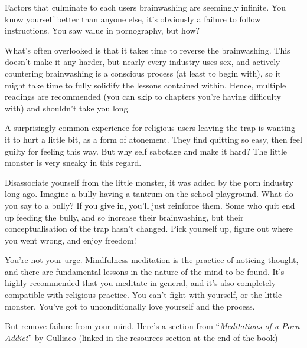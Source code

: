 \documentclass[
]{book}
\begin{document}
Factors that culminate to each users brainwashing are seemingly infinite. You know yourself better than anyone else, it's obviously a failure to follow instructions. You saw value in pornography, but how?

What's often overlooked is that it takes time to reverse the brainwashing. This doesn't make it any harder, but nearly every industry uses sex, and actively countering brainwashing is a conscious process (at least to begin with), so it might take time to fully solidify the lessons contained within. Hence, multiple readings are recommended (you can skip to chapters you're having difficulty with) and shouldn't take you long.

A surprisingly common experience for religious users leaving the trap is wanting it to hurt a little bit, as a form of atonement. They find quitting so easy, then feel guilty for feeling this way. But why self sabotage and make it hard? The little monster is very sneaky in this regard.

Disassociate yourself from the little monster, it was added by the porn industry long ago. Imagine a bully having a tantrum on the school playground. What do you say to a bully? If you give in, you'll just reinforce them. Some who quit end up feeding the bully, and so increase their brainwashing, but their conceptualisation of the trap hasn't changed. Pick yourself up, figure out where you went wrong, and enjoy freedom!

You're not your urge. Mindfulness meditation is the practice of noticing thought, and there are fundamental lessons in the nature of the mind to be found. It's highly recommended that you meditate in general, and it's also completely compatible with religious practice. You can't fight with yourself, or the little monster. You've got to unconditionally love yourself and the process.

But remove failure from your mind. Here's a section from ``\emph{Meditations of a Porn Addict}'' by Gulliaco (linked in the resources section at the end of the book)
\end{document}
